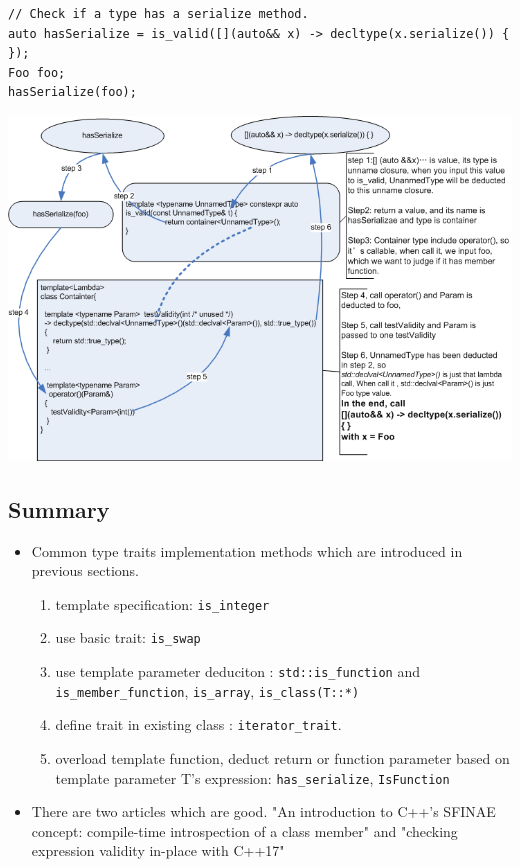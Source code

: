 \documentclass[a4paper,11pt,twoside]{book}
\begin{document}
\begin{itemize}
\begin{lstlisting}[numbers=none]
// Check if a type has a serialize method.
auto hasSerialize = is_valid([](auto&& x) -> decltype(x.serialize()) { });
Foo foo;
hasSerialize(foo);
\end{lstlisting}

\begin{center}
	\includegraphics[scale=0.59]{pics/is_valid.png}
\end{center}

\end{itemize}



\subsection{Summary}
\begin{itemize}
	\item Common type traits implementation methods which are introduced in previous sections. 
	\begin{enumerate}
		\item template specification: \texttt{is\_integer}
		\item use basic trait: \texttt{is\_swap}
		\item use template parameter deduciton : \texttt{std::is\_function} and
		\texttt{is\_member\_function}, \texttt{is\_array}, \texttt{is\_class(T::*)}
		\item define trait in existing class : \texttt{iterator\_trait}.
		\item overload template function, deduct return or function parameter based on template parameter T's expression:  \texttt{has\_serialize}, \texttt{IsFunction}
	\end{enumerate}

	\item There are two articles which are good.
"An introduction to C++'s SFINAE concept: compile-time introspection of a class member" and "checking expression validity in-place with C++17"
\end{itemize}
\end{document}
